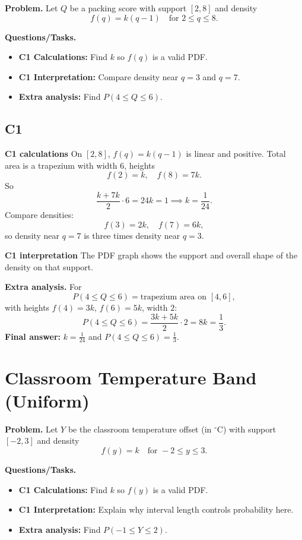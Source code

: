 \textbf{Problem.}
Let $Q$ be a packing score with support $[2,8]$ and density
\[
f(q)=k(q-1)\quad\text{for }2\le q\le 8.
\]

\textbf{Questions/Tasks.}
\begin{itemize}
	\item \textbf{C1 Calculations:} Find $k$ so $f(q)$ is a valid PDF.
	\item \textbf{C1 Interpretation:} Compare density near $q=3$ and $q=7$.
	\item \textbf{Extra analysis:} Find $P(4\le Q\le 6)$.
\end{itemize}

\subsection*{C1}

\textbf{C1 calculations}
On $[2,8]$, $f(q)=k(q-1)$ is linear and positive. Total area is a trapezium with width $6$, heights
	\[
	f(2)=k,\quad f(8)=7k.
	\]
	So
	\[
	\frac{k+7k}{2}\cdot6=24k=1\implies k=\frac1{24}.
	\]
	Compare densities:
	\[
	f(3)=2k,\quad f(7)=6k,
	\]
	so density near $q=7$ is three times density near $q=3$.

\textbf{C1 interpretation}
The PDF graph shows the support and overall shape of the density on that support.

\textbf{Extra analysis.}
For
\[
P(4\le Q\le6)=\text{trapezium area on }[4,6],
\]
with heights $f(4)=3k$, $f(6)=5k$, width $2$:
\[
P(4\le Q\le6)=\frac{3k+5k}{2}\cdot2=8k=\frac13.
\]
\textbf{Final answer:} $k=\frac1{24}$ and $P(4\le Q\le6)=\frac13$.
	\section{Classroom Temperature Band (Uniform)}
	
	\textbf{Problem.}
	Let $Y$ be the classroom temperature offset (in $^\circ$C) with support $[-2,3]$ and density
	\[
	f(y)=k\quad\text{for }-2\le y\le 3.
	\]
	
	\textbf{Questions/Tasks.}
	\begin{itemize}
		\item \textbf{C1 Calculations:} Find $k$ so $f(y)$ is a valid PDF.
		\item \textbf{C1 Interpretation:} Explain why interval length controls probability here.
		\item \textbf{Extra analysis:} Find $P(-1\le Y\le 2)$.
	\end{itemize}

